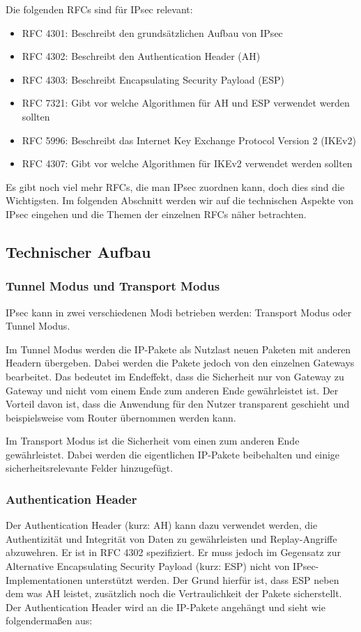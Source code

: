 \documentclass[12pt]{scrartcl}
\begin{document}
Die folgenden RFCs sind für IPsec relevant:
\begin{itemize}
\item RFC 4301: Beschreibt den grundsätzlichen Aufbau von IPsec\cite{RFC4301}
\item RFC 4302: Beschreibt den Authentication Header (AH)\cite{RFC4302}
\item RFC 4303: Beschreibt Encapsulating Security Payload (ESP)\cite{RFC4303}
\item RFC 7321: Gibt vor welche Algorithmen für AH und ESP verwendet werden sollten\cite{RFC7321}
\item RFC 5996: Beschreibt das Internet Key Exchange Protocol Version 2 (IKEv2)\cite{RFC5996}
\item RFC 4307: Gibt vor welche Algorithmen für IKEv2 verwendet werden sollten\cite{RFC4307}
\end{itemize}
Es gibt noch viel mehr RFCs, die man IPsec zuordnen kann, doch dies sind die Wichtigsten. Im folgenden Abschnitt werden wir auf die technischen Aspekte von IPsec eingehen und die Themen der einzelnen RFCs näher betrachten.

\subsection{Technischer Aufbau}
\subsubsection{Tunnel Modus und Transport Modus}
IPsec kann in zwei verschiedenen Modi betrieben werden: Transport Modus oder Tunnel Modus. \cite{RFC4301}

Im Tunnel Modus werden die IP-Pakete als Nutzlast neuen Paketen mit anderen Headern übergeben. Dabei werden die Pakete jedoch von den einzelnen Gateways bearbeitet. Das bedeutet im Endeffekt, dass die Sicherheit nur von Gateway zu Gateway und nicht vom einem Ende zum anderen Ende gewährleistet ist. Der Vorteil davon ist, dass die Anwendung für den Nutzer transparent geschieht und beispielsweise vom Router übernommen werden kann.

Im Transport Modus ist die Sicherheit vom einen zum anderen Ende gewährleistet. Dabei werden die eigentlichen IP-Pakete beibehalten und einige sicherheitsrelevante Felder hinzugefügt.

\subsubsection{Authentication Header}
Der Authentication Header (kurz: AH) kann dazu verwendet werden, die Authentizität und Integrität von Daten zu gewährleisten und Replay-Angriffe abzuwehren. Er ist in RFC 4302 spezifiziert.\cite{RFC4302} Er muss jedoch im Gegensatz zur Alternative Encapsulating Security Payload (kurz: ESP) nicht von IPsec-Implementationen unterstützt werden.\cite{RFC4301} Der Grund hierfür ist, dass ESP neben dem was AH leistet, zusätzlich noch die Vertraulichkeit der Pakete sicherstellt. Der Authentication Header wird an die IP-Pakete angehängt und sieht wie folgendermaßen aus:
\end{document}

